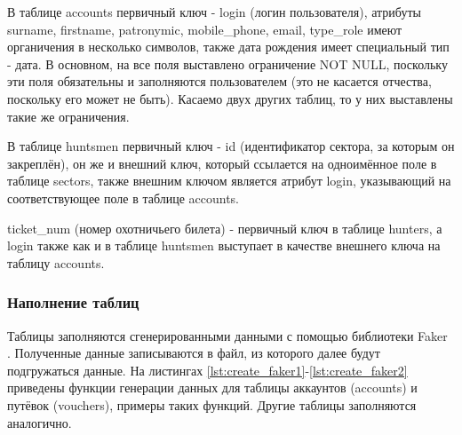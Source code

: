 		В таблице accounts первичный ключ - login (логин пользователя), атрибуты surname, firstname, patronymic, mobile\_phone, email, type\_role имеют органичения в несколько символов, также дата рождения имеет специальный тип - дата. В основном, на все поля выставлено ограничение NOT NULL, поскольку эти поля обязательны и заполняются пользователем (это не касается отчества, поскольку его может не быть). Касаемо двух других таблиц, то у них выставлены такие же ограничения.
		
		В таблице huntsmen первичный ключ - id (идентификатор сектора, за которым он закреплён), он же и внешний ключ, который ссылается на одноимённое поле в таблице sectors, также внешним ключом является атрибут login, указывающий на соответствующее поле в таблице accounts.
		
		ticket\_num (номер охотничьего билета) - первичный ключ в таблице hunters, а login также как и в таблице huntsmen выступает в качестве внешнего ключа на таблицу accounts.
			
		\subsubsection{Наполнение таблиц}
		Таблицы заполняются сгенерированными данными с помощью библиотеки Faker \cite{faker}. Полученные данные записываются в файл, из которого далее будут подгружаться данные. На листингах \ref{lst:create_faker1}-\ref{lst:create_faker2} приведены функции генерации данных для таблицы аккаунтов (accounts) и путёвок (vouchers), примеры таких функций. Другие таблицы заполняются аналогично.
		
